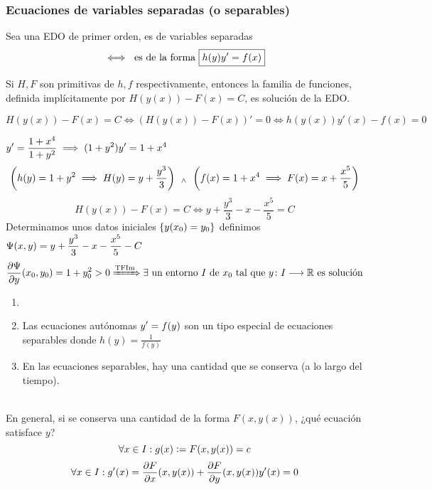 \subsubsection{Ecuaciones de variables separadas (o separables)}
\begin{defn}
	Sea una EDO de primer orden, es de variables separadas
	\[\iff \text{ es de la forma } \boxed{h(y)y'=f(x)}\]
\end{defn}
\begin{prop}
	Si $H, F$ son primitivas de $h, f$ respectivamente, entonces la familia de funciones, definida implícitamente por $H(y(x))-F(x)=C$, es solución de la EDO.
	\begin{dem}
		\[H(y(x))-F(x)=C \iff \left(H(y(x))-F(x)\right)'=0 \iff h(y(x))y'(x)-f(x)=0\]
	\end{dem}
\end{prop}
\begin{ejem}
	$\displaystyle y'=\frac{1+x^4}{1+y^2} \implies (1+y^2)y'=1+x^4$
	\[\left(h(y)=1+y^2 \implies H(y)=y + \frac{y^3}{3}\right) \, \; _{\wedge} \; \, \left(f(x)=1+x^4 \implies F(x)=x+\frac{x^5}{5}\right)\]
	\[H(y(x))-F(x)=C \iff y + \frac{y^3}{3}-x-\frac{x^5}{5} = C\]
	Determinamos unos datos iniciales $\displaystyle \{y(x_0)=y_0\}$ definimos $\displaystyle \Psi(x, y)=y + \frac{y^3}{3}-x-\frac{x^5}{5}-C$
	\[\frac{\partial\Psi}{\partial y}(x_0, y_0) = 1+ y_0^2>0 \xRightarrow{\text{TFIm}} \exists \text{ un entorno } I \text{ de } x_0 \text{ tal que } y \colon I \longrightarrow \mathbb{R} \text{ es solución}\]
\end{ejem}

\begin{obs}
	\begin{enumerate}
		\item[]
		\item Las ecuaciones autónomas $\displaystyle y'=f(y)$ son un tipo especial de ecuaciones separables donde $h(y)=\frac{1}{f(y)}$
		\item En las ecuaciones separables, hay una cantidad que se conserva (a lo largo del tiempo).
	\end{enumerate}
\end{obs}

\\
En general, si se conserva una cantidad de la forma $F(x, y(x))$, ¿qué ecuación satisface $y$?
\[\forall x \in I : g(x)\vcentcolon= F(x, y(x))= c\]
\[\forall x \in I : g'(x)=\pdv{F}{x}(x,y(x)) + \pdv{F}{y}(x, y(x))y'(x)=0\] %
